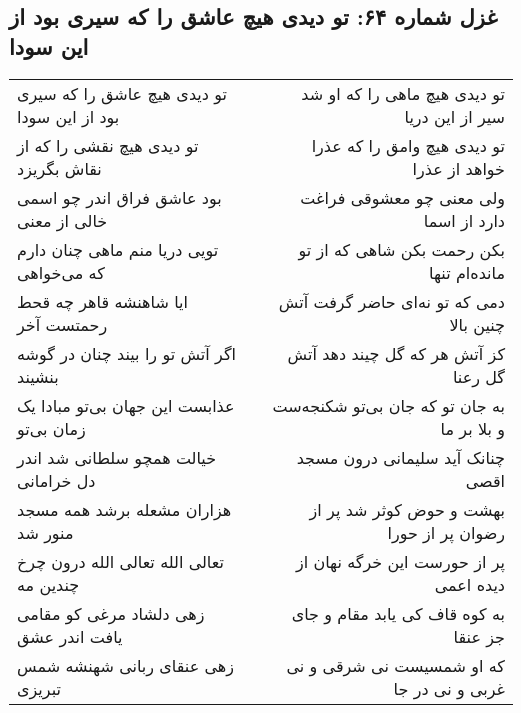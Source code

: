 \begin{center}
\section*{غزل شماره ۶۴: تو دیدی هیچ عاشق را که سیری بود از این سودا}
\label{sec:0064}
\begin{longtable}{l p{0.5cm} r}
تو دیدی هیچ عاشق را که سیری بود از این سودا
&&
تو دیدی هیچ ماهی را که او شد سیر از این دریا
\\
تو دیدی هیچ نقشی را که از نقاش بگریزد
&&
تو دیدی هیچ وامق را که عذرا خواهد از عذرا
\\
بود عاشق فراق اندر چو اسمی خالی از معنی
&&
ولی معنی چو معشوقی فراغت دارد از اسما
\\
تویی دریا منم ماهی چنان دارم که می‌خواهی
&&
بکن رحمت بکن شاهی که از تو مانده‌ام تنها
\\
ایا شاهنشه قاهر چه قحط رحمتست آخر
&&
دمی که تو نه‌ای حاضر گرفت آتش چنین بالا
\\
اگر آتش تو را بیند چنان در گوشه بنشیند
&&
کز آتش هر که گل چیند دهد آتش گل رعنا
\\
عذابست این جهان بی‌تو مبادا یک زمان بی‌تو
&&
به جان تو که جان بی‌تو شکنجه‌ست و بلا بر ما
\\
خیالت همچو سلطانی شد اندر دل خرامانی
&&
چنانک آید سلیمانی درون مسجد اقصی
\\
هزاران مشعله برشد همه مسجد منور شد
&&
بهشت و حوض کوثر شد پر از رضوان پر از حورا
\\
تعالی الله تعالی الله درون چرخ چندین مه
&&
پر از حورست این خرگه نهان از دیده اعمی
\\
زهی دلشاد مرغی کو مقامی یافت اندر عشق
&&
به کوه قاف کی یابد مقام و جای جز عنقا
\\
زهی عنقای ربانی شهنشه شمس تبریزی
&&
که او شمسیست نی شرقی و نی غربی و نی در جا
\\
\end{longtable}
\end{center}
